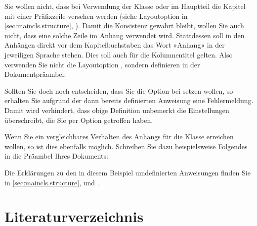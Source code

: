 \begin{Example}
  Sie wollen nicht, dass bei Verwendung der Klasse  oder
   im Hauptteil die Kapitel mit einer Präfixzeile versehen
  werden (siehe Layoutoption 
  in \autoref{sec:maincls.structure},
  ).  Damit die Konsistenz
  gewahrt bleibt, wollen Sie auch nicht, dass eine solche Zeile im Anhang
  verwendet wird. Stattdessen soll in den Anhängen direkt vor dem
  Kapitelbuchstaben das Wort »Anhang« in der jeweiligen Sprache stehen. Dies
  soll auch für die Kolumnentitel gelten. Also verwenden Sie nicht die
  Layoutoption , sondern
  definieren in der Dokumentpräambel:
\begin{lstcode}
  \newcommand*{\appendixmore}{%
    \renewcommand*{\chapterformat}{%
      \appendixname~\thechapter\autodot\enskip}%
    \renewcommand*{\chaptermarkformat}{%
      \appendixname~\thechapter\autodot\enskip}}
\end{lstcode}
  Sollten Sie doch noch entscheiden, dass Sie die Option
   bei
   setzen wollen, so erhalten Sie aufgrund
  der dann bereits definierten Anweisung  eine
  Fehlermeldung. Damit wird verhindert, dass obige Definition unbemerkt die
  Einstellungen überschreibt, die Sie per Option getroffen haben.

  Wenn Sie ein vergleichbares Verhalten des Anhangs für die Klasse
   erreichen wollen, so ist dies ebenfalls möglich. Schreiben
  Sie dazu beispielsweise Folgendes in die  Präambel Ihres Dokuments:
\begin{lstcode}
  \newcommand*{\appendixmore}{%
    \renewcommand*{\sectionformat}{%
      \appendixname~\thesection\autodot\enskip}%
    \renewcommand*{\sectionmarkformat}{%
      \appendixname~\thesection\autodot\enskip}}
\end{lstcode}

  Die Erklärungen zu den in diesem Beispiel umdefinierten Anweisungen finden
  Sie in \autoref{sec:maincls.structure},
   und
  .
\end{Example}%
%
\EndIndexGroup
\ExampleEndFix


\section{Literaturverzeichnis}

